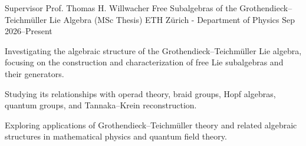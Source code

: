 

\begin{cventries}

  \cventry
  {Supervisor Prof. Thomas H. Willwacher} %
  {Free Subalgebras of the Grothendieck--Teichmüller Lie Algebra (MSc Thesis)} %
  {ETH Zürich - Department of Physics} %
  {Sep 2026--Present} %
  {
    \begin{cvitems} %
      \item {Investigating the algebraic structure of the Grothendieck--Teichmüller Lie algebra, focusing on the construction and characterization of free Lie subalgebras and their generators.}
      \item {Studying its relationships with operad theory, braid groups, Hopf algebras, quantum groups, and Tannaka--Krein reconstruction.}
      \item {Exploring applications of Grothendieck--Teichmüller theory and related algebraic structures in mathematical physics and quantum field theory.}
    \end{cvitems}
  }



\end{cventries}

